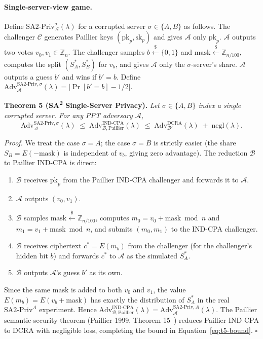 \paragraph{Single-server-view game.} Define $\mathrm{SA2\text{-}Priv}^{\sigma}_{\mathcal{A}}(\lambda)$ for a corrupted server $\sigma \in \{A, B\}$ as follows. The challenger $\mathcal{C}$ generates Paillier keys $(\text{pk}_p, \text{sk}_p)$ and gives $\mathcal{A}$ only $\text{pk}_p$. $\mathcal{A}$ outputs two votes $v_0, v_1 \in \mathbb{Z}_n$. The challenger samples $b \stackrel{\$}{\leftarrow} \{0,1\}$ and $\text{mask} \stackrel{\$}{\leftarrow} \mathbb{Z}_{n/100}$, computes the split $(S_A^*, S_B^*)$ for $v_b$, and gives $\mathcal{A}$ only the $\sigma$-server's share. $\mathcal{A}$ outputs a guess $b'$ and wins if $b' = b$. Define $\mathrm{Adv}^{\mathrm{SA2\text{-}Priv}, \sigma}_{\mathcal{A}}(\lambda) = |\Pr[b' = b] - 1/2|$.

\textbf{Theorem 5 (SA\textsuperscript{2} Single-Server Privacy).} \textit{Let $\sigma \in \{A, B\}$ index a single corrupted server. For any PPT adversary $\mathcal{A}$,}
\begin{equation}
    \mathrm{Adv}^{\mathrm{SA2\text{-}Priv}, \sigma}_{\mathcal{A}}(\lambda) \;\leq\; \mathrm{Adv}^{\mathrm{IND\text{-}CPA}}_{\mathcal{B}, \mathrm{Paillier}}(\lambda) \;\leq\; \mathrm{Adv}^{\mathrm{DCRA}}_{\mathcal{B}'}(\lambda) \;+\; \mathrm{negl}(\lambda).
    \label{eq:t5-bound}
\end{equation}

\textit{Proof.} We treat the case $\sigma = A$; the case $\sigma = B$ is strictly easier (the share $S_B = E(-\text{mask})$ is independent of $v_b$, giving zero advantage). The reduction $\mathcal{B}$ to Paillier IND-CPA is direct:
\begin{enumerate}
    \item $\mathcal{B}$ receives $\text{pk}_p$ from the Paillier IND-CPA challenger and forwards it to $\mathcal{A}$.
    \item $\mathcal{A}$ outputs $(v_0, v_1)$.
    \item $\mathcal{B}$ samples $\text{mask} \stackrel{\$}{\leftarrow} \mathbb{Z}_{n/100}$, computes $m_0 = v_0 + \text{mask} \bmod n$ and $m_1 = v_1 + \text{mask} \bmod n$, and submits $(m_0, m_1)$ to the IND-CPA challenger.
    \item $\mathcal{B}$ receives ciphertext $c^* = E(m_b)$ from the challenger (for the challenger's hidden bit $b$) and forwards $c^*$ to $\mathcal{A}$ as the simulated $S_A^*$.
    \item $\mathcal{B}$ outputs $\mathcal{A}$'s guess $b'$ as its own.
\end{enumerate}
Since the same $\text{mask}$ is added to both $v_0$ and $v_1$, the value $E(m_b) = E(v_b + \text{mask})$ has exactly the distribution of $S_A^*$ in the real $\mathrm{SA2\text{-}Priv}^A$ experiment. Hence $\mathrm{Adv}^{\mathrm{IND\text{-}CPA}}_{\mathcal{B}, \mathrm{Paillier}}(\lambda) = \mathrm{Adv}^{\mathrm{SA2\text{-}Priv}, A}_{\mathcal{A}}(\lambda)$. The Paillier semantic-security theorem (Paillier 1999, Theorem 15~\cite{paillier1999}) reduces Paillier IND-CPA to DCRA with negligible loss, completing the bound in Equation~\eqref{eq:t5-bound}. \hfill $\square$

